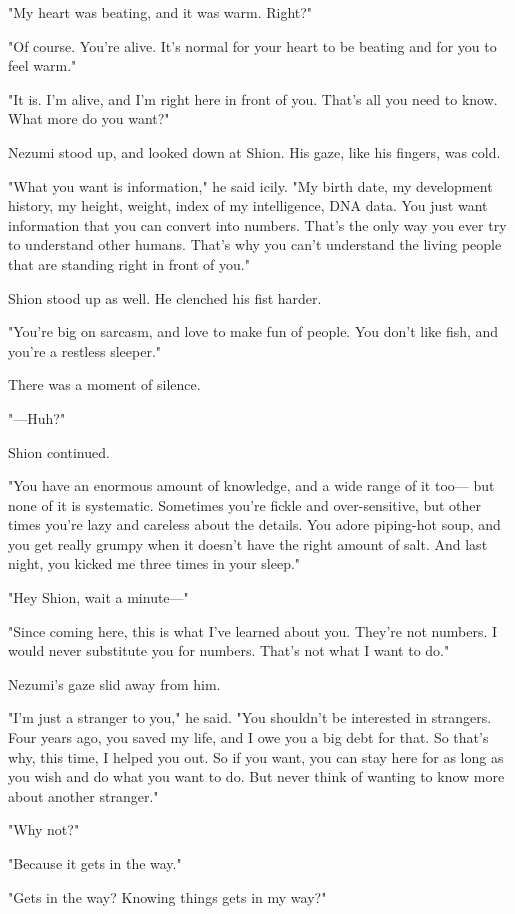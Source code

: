 "My heart was beating, and it was warm. Right?"

"Of course. You're alive. It's normal for your heart to be beating and
for you to feel warm."

"It is. I'm alive, and I'm right here in front of you. That's all you
need to know. What more do you want?"

Nezumi stood up, and looked down at Shion. His gaze, like his fingers,
was cold.

"What you want is information," he said icily. "My birth date, my
development history, my height, weight, index of my intelligence, DNA
data. You just want information that you can convert into numbers.
That's the only way you ever try to understand other humans. That's why
you can't understand the living people that are standing right in front
of you."

Shion stood up as well. He clenched his fist harder.

"You're big on sarcasm, and love to make fun of people. You don't like
fish, and you're a restless sleeper."

There was a moment of silence.

"---Huh?"

Shion continued.

"You have an enormous amount of knowledge, and a wide range of it too---
but none of it is systematic. Sometimes you're fickle and
over-sensitive, but other times you're lazy and careless about the
details. You adore piping-hot soup, and you get really grumpy when it
doesn't have the right amount of salt. And last night, you kicked me
three times in your sleep."

"Hey Shion, wait a minute---"

"Since coming here, this is what I've learned about you. They're not
numbers. I would never substitute you for numbers. That's not what I
want to do."

Nezumi's gaze slid away from him.

"I'm just a stranger to you," he said. "You shouldn't be interested in
strangers. Four years ago, you saved my life, and I owe you a big debt
for that. So that's why, this time, I helped you out. So if you want,
you can stay here for as long as you wish and do what you want to do.
But never think of wanting to know more about another stranger."

"Why not?"

"Because it gets in the way."

"Gets in the way? Knowing things gets in my way?"


